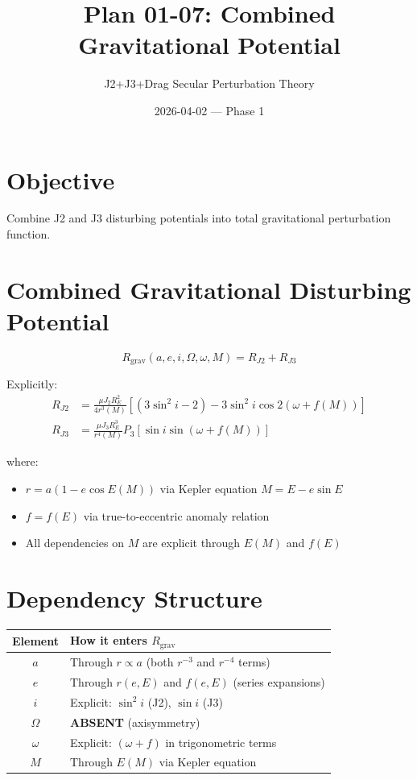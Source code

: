 \documentclass[11pt]{article}
\title{Plan 01-07: Combined Gravitational Potential}
\author{J2+J3+Drag Secular Perturbation Theory}
\date{2026-04-02 — Phase 1}
\begin{document}
\maketitle

\section{Objective}
Combine J2 and J3 disturbing potentials into total gravitational perturbation function.

\section{Combined Gravitational Disturbing Potential}

\begin{equation}
\boxed{R_{\text{grav}}(a,e,i,\Omega,\omega,M) = R_{J2} + R_{J3}}
\label{eq:rgrav}
\end{equation}

Explicitly:
\begin{align}
R_{J2} &= \frac{\mu J_2 R_E^2}{4r^3(M)}\left[(3\sin^2 i - 2) - 3\sin^2 i \cos 2(\omega + f(M))\right]\\
R_{J3} &= \frac{\mu J_3 R_E^3}{r^4(M)} P_3[\sin i \sin(\omega + f(M))]
\end{align}

where:
\begin{itemize}
    \item $r = a(1 - e\cos E(M))$ via Kepler equation $M = E - e\sin E$
    \item $f = f(E)$ via true-to-eccentric anomaly relation
    \item All dependencies on $M$ are explicit through $E(M)$ and $f(E)$
\end{itemize}

\section{Dependency Structure}

\begin{center}
\begin{tabular}{c|l}
\textbf{Element} & \textbf{How it enters $R_{\text{grav}}$} \\
\hline
$a$ & Through $r \propto a$ (both $r^{-3}$ and $r^{-4}$ terms) \\
$e$ & Through $r(e,E)$ and $f(e,E)$ (series expansions) \\
$i$ & Explicit: $\sin^2 i$ (J2), $\sin i$ (J3) \\
$\Omega$ & \textbf{ABSENT} (axisymmetry) \\
$\omega$ & Explicit: $(\omega + f)$ in trigonometric terms \\
$M$ & Through $E(M)$ via Kepler equation \\
\end{tabular}
\end{center}
\end{document}
